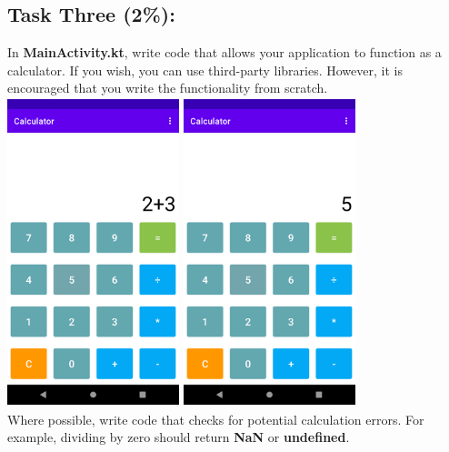 \documentclass{article}
\begin{document}
\subsection*{Task Three (2\%):} 
In \textbf{MainActivity.kt}, write code that allows your application to function as a calculator. If you wish, you can use third-party libraries. However, it is encouraged that you write the functionality from scratch. \\

\includegraphics[width=5cm, height=9cm]{../tex/img/practicals/02-calculator-3.png}
\includegraphics[width=5cm, height=9cm]{../tex/img/practicals/02-calculator-4.png} \\

Where possible, write code that checks for potential calculation errors. For example, dividing by zero should return \textbf{NaN} or \textbf{undefined}. \\
\end{document}
